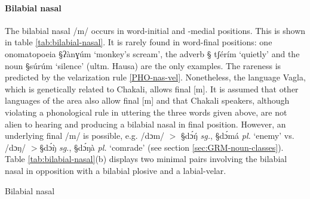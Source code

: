 \paragraph{Bilabial nasal}
\label{sec:PHON-bil-nas}
The bilabial nasal /m/ occurs in word-initial and -medial
positions. This is shown in table \ref{tab:bilabial-nasal}. It is rarely  found 
in  word-final positions:
one onomatopoeia {\S ʔànɣúm} `monkey's scream', the adverb {\S
tʃérím} `quietly' and the noun {\S súrúm} `silence' (ultm. Hausa) are the
only
examples. The rareness is predicted by  the  velarization rule
\ref{PHO-nas-vel}. Nonetheless,
the language Vagla, which is genetically related  to Chakali,  allows final
[m].  It is assumed that other languages of the area also allow final  [m] and
that
Chakali speakers, although violating a phonological rule in uttering the three
words given above,  are not alien to
hearing and producing  a bilabial nasal  in final position. However,
 an underlying final /m/ is possible, e.g. /dɔm/ $>$ {\S dɔ́ŋ́} {\it
sg.}, {\S dɔ́má}  {\it pl.} `enemy'  vs.  /dɔŋ/ $>${\S dɔ́ŋ̀} {\it
sg.}, {\S dɔ́ŋà}  {\it pl.}  `comrade' (see section
\ref{sec:GRM-noun-classes}). Table
\ref{tab:bilabial-nasal}(b) displays two minimal pairs involving the bilabial
nasal in opposition with a bilabial plosive and  a labial-velar.

\begin{table}[htb]
\centering
\caption{Bilabial nasal\label{tab:bilabial-nasal}}

\quad
{}


\end{table}


